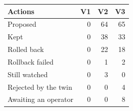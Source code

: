 \begin{tabular}{@{}lrrr@{}}
\toprule
Actions & V1 & V2 & V3 \\
\midrule
Proposed & 0 & 64 & 65 \\
Kept & 0 & 38 & 33 \\
Rolled back & 0 & 22 & 18 \\
Rollback failed & 0 & 1 & 2 \\
Still watched & 0 & 3 & 0 \\
Rejected by the twin & 0 & 0 & 4 \\
Awaiting an operator & 0 & 0 & 8 \\
\bottomrule
\end{tabular}

